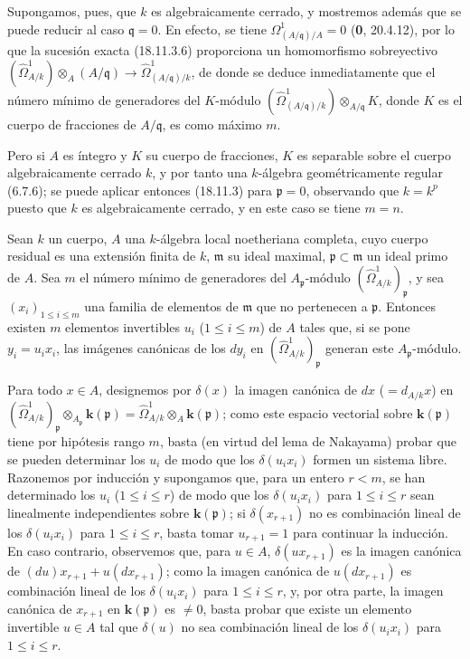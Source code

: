 Supongamos, pues, que $k$ es algebraicamente cerrado, y mostremos además que se puede reducir al caso $\mathfrak q=0$. En efecto, se tiene $\Omega^1_{(A/\mathfrak q)/A}=0$ (\textbf 0, 20.4.12), por lo que la sucesión exacta (18.11.3.6) proporciona un homomorfismo sobreyectivo $(\hat{\Omega}^1_{A/k})\otimes_A(A/\mathfrak q)\to\hat{\Omega}^1_{(A/\mathfrak q)/k}$, de donde se deduce inmediatamente que el número mínimo de generadores del $K$-módulo $(\hat{\Omega}^1_{(A/\mathfrak q)/k})\otimes_{A/\mathfrak q}K$, donde $K$ es el cuerpo de fracciones de $A/\mathfrak q$, es como máximo $m$.

Pero si $A$ es íntegro y $K$ su cuerpo de fracciones, $K$ es separable sobre el cuerpo algebraicamente cerrado $k$, y por tanto una $k$-álgebra geométricamente regular (6.7.6); se puede aplicar entonces (18.11.3) para $\mathfrak p=0$, observando que $k=k^p$ puesto que $k$ es algebraicamente cerrado, y en este caso se tiene $m=n$.

\begin{lemma}[18.11.5.2]
\label{IV.18.11.5.2}
Sean $k$ un cuerpo, $A$ una $k$-álgebra local noetheriana completa, cuyo cuerpo residual es una extensión finita de $k$, $\mathfrak m$ su ideal maximal, $\mathfrak p\subset\mathfrak m$ un ideal primo de $A$. Sea $m$ el número mínimo de generadores del $A_{\mathfrak p}$-módulo $(\hat{\Omega}^1_{A/k})_{\mathfrak p}$, y sea $(x_i)_{1\leq i\leq m}$ una familia de elementos de $\mathfrak m$ que no pertenecen a $\mathfrak p$. Entonces existen $m$ elementos invertibles $u_i$ \textup{(}$1\leq i\leq m$\textup{)} de $A$ tales que, si se pone $y_i=u_ix_i$, las imágenes canónicas de los $dy_i$ en $(\hat{\Omega}^1_{A/k})_{\mathfrak p}$ generan este $A_{\mathfrak p}$-módulo.
\end{lemma}

Para todo $x\in A$, designemos por $\delta(x)$ la imagen canónica de $dx$ ($=d_{A/k}x$) en $(\hat{\Omega}^1_{A/k})_{\mathfrak p}\otimes_{A_{\mathfrak p}}\boldsymbol{k}(\mathfrak p)=\hat{\Omega}^1_{A/k}\otimes_A\boldsymbol{k}(\mathfrak p)$; como este espacio vectorial sobre $\boldsymbol{k}(\mathfrak p)$ tiene por hipótesis rango $m$, basta (en virtud del lema de Nakayama) probar que se pueden determinar los $u_i$ de modo que los $\delta(u_ix_i)$ formen un sistema libre. Razonemos por inducción y supongamos que, para un entero $r<m$, se han determinado los $u_i$ ($1\leq i\leq r$) de modo que los $\delta(u_ix_i)$ para $1\leq i\leq r$ sean linealmente independientes sobre $\boldsymbol{k}(\mathfrak p)$; si $\delta(x_{r+1})$ no es combinación lineal de los $\delta(u_ix_i)$ para $1\leq i\leq r$, basta tomar $u_{r+1}=1$ para continuar la inducción. En caso contrario, observemos que, para $u\in A$, $\delta(ux_{r+1})$ es la imagen canónica de $(du)x_{r+1}+u(dx_{r+1})$; como la imagen canónica de $u(dx_{r+1})$ es combinación lineal de los $\delta(u_ix_i)$ para $1\leq i\leq r$, y, por otra parte, la imagen canónica de $x_{r+1}$ en $\boldsymbol{k}(\mathfrak p)$ es $\neq0$, basta probar que existe un elemento invertible $u\in A$ tal que $\delta(u)$ no sea combinación lineal de los $\delta(u_ix_i)$ para $1\leq i\leq r$.



